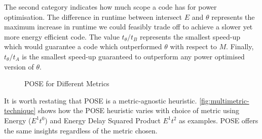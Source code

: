 The second category indicates how much scope a code has for power optimisation.
The difference in runtime between intersect $E$ and $\theta$ represents the maximum increase in runtime we could feasibly trade off to achieve a slower yet more energy efficient code.
The value $t_\theta / t_B$ represents the smallest speed-up which would guarantee a code which outperformed $\theta$ with respect to $M$.
Finally, $t_\theta / t_A$ is the smallest speed-up guaranteed to outperform any power optimised version of $\theta$.
\begin{figure}
\centering

\caption{POSE for Different Metrics}
\label{fig:multimetric-technique}
\end{figure}

It is worth restating that POSE is a metric-agnostic heuristic. \autoref{fig:multimetric-technique} shows how the POSE heuristic varies with choice of metric using Energy ($E^1t^0$) and Energy Delay Squared Product $E^1t^2$ as examples. POSE offers the same insights regardless of the metric chosen.


